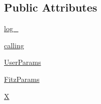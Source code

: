 \subsection*{Public Attributes}
\begin{DoxyCompactItemize}
\item 
\hyperlink{classpyneb_1_1extinction_1_1red__corr_1_1_red_corr_a712aff76d06f15896ed30e689103f66d}{log\+\_\+}
\item 
\hyperlink{classpyneb_1_1extinction_1_1red__corr_1_1_red_corr_a30606dfd94b4cefefd10dbb1f7cbd473}{calling}
\item 
\hyperlink{classpyneb_1_1extinction_1_1red__corr_1_1_red_corr_a7e1e251a6bd48ed36428c4654af46606}{User\+Params}
\item 
\hyperlink{classpyneb_1_1extinction_1_1red__corr_1_1_red_corr_a133fcc7513d358e629266b24cbe7bebc}{Fitz\+Params}
\item 
\hyperlink{classpyneb_1_1extinction_1_1red__corr_1_1_red_corr_aac92bb80311cda78c01e61aa44655251}{X}
\end{DoxyCompactItemize}
